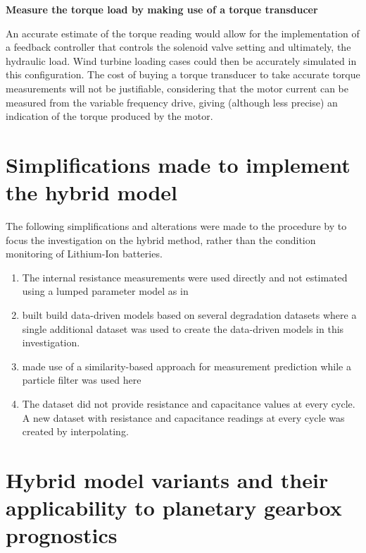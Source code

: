 \textbf{Measure the torque load by making use of a torque transducer}

An accurate estimate of the torque reading would allow for the implementation of a feedback controller that controls the solenoid valve setting and ultimately, the hydraulic load. Wind turbine loading cases could then be accurately simulated in this configuration. The cost of buying a torque transducer to take accurate torque measurements will not be justifiable, considering that the motor current can be measured from the variable frequency drive, giving (although less precise) an indication of the torque produced by the motor. 



\chapter{Simplifications made to implement the hybrid model} \label{A:simplifications}

The following simplifications and alterations were made to the procedure by \cite{Liao2016} to focus the investigation on the hybrid method, rather than the condition monitoring of Lithium-Ion batteries.
\begin{enumerate}
	\item The internal resistance measurements were used directly and not estimated using a lumped parameter model as in \cite{Liao2016}
	\item \cite{Liao2016} built build data-driven models based on several degradation datasets where a single additional dataset was used to create the data-driven models in this investigation. 
	\item \cite{Liao2016} made use of a similarity-based approach for measurement prediction while a particle filter was used here
	\item The dataset did not provide resistance and capacitance values at every cycle. A new dataset with resistance and capacitance readings at every cycle was created by interpolating. 
\end{enumerate}






\chapter{Hybrid model variants and their applicability to planetary gearbox prognostics} \label{A:Hybrid}

